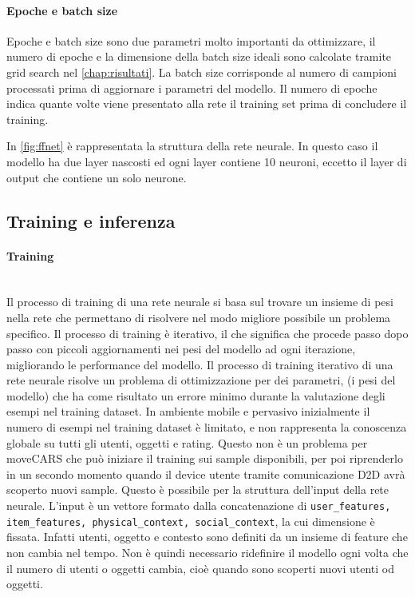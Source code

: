 \documentclass[12pt,italian]{report}
\newcommand{\myparagraph}[1]{\paragraph{#1}\mbox{}\\}
\begin{document}
\paragraph{Epoche e batch size}
Epoche e batch size sono due parametri molto importanti da ottimizzare, il numero di epoche e la dimensione della batch size ideali sono calcolate tramite grid search nel \autoref{chap:risultati}. La batch size corrisponde al numero di campioni processati prima di aggiornare i parametri del modello. Il numero di epoche indica quante volte viene presentato alla rete il training set prima di concludere il training.

\bigskip
In \autoref{fig:ffnet} è rappresentata la struttura della rete neurale. In questo caso il modello ha due layer nascosti ed ogni layer contiene 10 neuroni, eccetto il layer di output che contiene un solo neurone.

\subsection{Training e inferenza} \label{subsec: training}
\myparagraph{Training}
Il processo di training di una rete neurale si basa sul trovare un insieme di pesi nella rete che permettano di risolvere nel modo migliore possibile un problema specifico. Il processo di training è iterativo, il che significa che procede passo dopo passo con piccoli aggiornamenti nei pesi del modello ad ogni iterazione, migliorando le performance del modello. Il processo di training iterativo di una rete neurale risolve un problema di ottimizzazione per dei parametri, (i pesi del modello) che ha come risultato un errore minimo durante la valutazione degli esempi nel training dataset. In ambiente mobile e pervasivo inizialmente il numero di esempi nel training dataset è limitato, e non rappresenta la conoscenza globale su tutti gli utenti, oggetti e rating. Questo non è un problema per moveCARS che può iniziare il training sui sample disponibili, per poi riprenderlo in un secondo momento quando il device utente tramite comunicazione D2D avrà scoperto nuovi sample. Questo è possibile per la struttura dell'input della rete neurale. L'input è un vettore formato dalla concatenazione di \texttt{user\_features, item\_features, physical\_context, social\_context}, la cui dimensione è fissata. Infatti utenti, oggetto e contesto sono definiti da un insieme di feature che non cambia nel tempo. Non è quindi necessario ridefinire il modello ogni volta che il numero di utenti o oggetti cambia, cioè quando sono scoperti nuovi utenti od oggetti.
\end{document}

